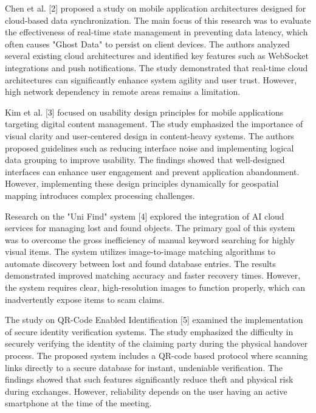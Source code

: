 \documentclass[12pt,a4paper]{report}
\begin{document}
\vspace{0.4cm}

Chen et al. [2] proposed a study on mobile application architectures designed for cloud-based data synchronization. The main focus of this research was to evaluate the effectiveness of real-time state management in preventing data latency, which often causes "Ghost Data" to persist on client devices. The authors analyzed several existing cloud architectures and identified key features such as WebSocket integrations and push notifications. The study demonstrated that real-time cloud architectures can significantly enhance system agility and user trust. However, high network dependency in remote areas remains a limitation.

\vspace{0.4cm}

Kim et al. [3] focused on usability design principles for mobile applications targeting digital content management. The study emphasized the importance of visual clarity and user-centered design in content-heavy systems. The authors proposed guidelines such as reducing interface noise and implementing logical data grouping to improve usability. The findings showed that well-designed interfaces can enhance user engagement and prevent application abandonment. However, implementing these design principles dynamically for geospatial mapping introduces complex processing challenges.

\vspace{0.4cm}

Research on the "Uni Find" system [4] explored the integration of AI cloud services for managing lost and found objects. The primary goal of this system was to overcome the gross inefficiency of manual keyword searching for highly visual items. The system utilizes image-to-image matching algorithms to automate discovery between lost and found database entries. The results demonstrated improved matching accuracy and faster recovery times. However, the system requires clear, high-resolution images to function properly, which can inadvertently expose items to scam claims.

\vspace{0.4cm}

The study on QR-Code Enabled Identification [5] examined the implementation of secure identity verification systems. The study emphasized the difficulty in securely verifying the identity of the claiming party during the physical handover process. The proposed system includes a QR-code based protocol where scanning links directly to a secure database for instant, undeniable verification. The findings showed that such features significantly reduce theft and physical risk during exchanges. However, reliability depends on the user having an active smartphone at the time of the meeting.
\end{document}
